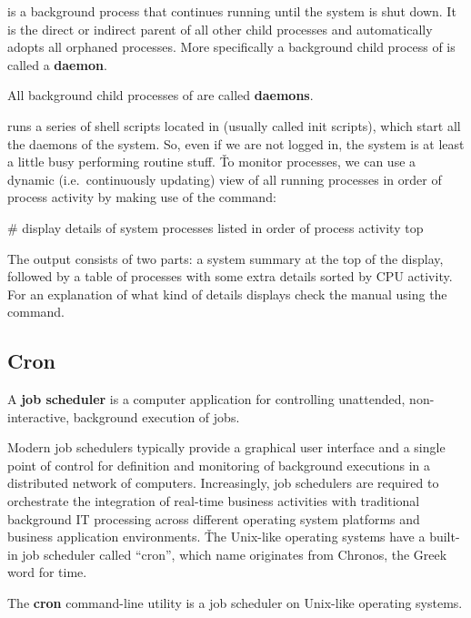  is a background process that continues running until the system is shut down. It is the direct or indirect
parent of all other child processes and automatically adopts all orphaned processes. More specifically a background
child process of  is called a \textbf{daemon}.

\bd[Daemon]
All background child processes of  are called \textbf{daemons}.
\ed

 runs a series of shell scripts located in  (usually called init scripts), which start all the
daemons of the system. So, even if we are not logged in, the system is at least a little busy performing routine stuff.
\v

To monitor processes, we can use a dynamic (i.e.\ continuously updating) view of all running processes in order of
process activity by making use of the  command:
\begin{bash}
# display details of system processes listed in order of process activity
top
\end{bash}

The  output consists of two parts: a system summary at the top of the display, followed by a table of
processes with some extra details sorted by CPU activity. For an explanation of what kind of details 
displays check the manual using the  command.

\subsection{Cron}\label{subsec:cron}

\label{def:job_scheduler}
A \textbf{job scheduler} is a computer application for controlling unattended, non-interactive, background execution of
jobs.
\ed

Modern job schedulers typically provide a graphical user interface and a single point of control for definition and
monitoring of background executions in a distributed network of computers. Increasingly, job schedulers are required
to orchestrate the integration of real-time business activities with traditional background IT processing across
different operating system platforms and business application environments. \v

The Unix-like operating systems have a built-in job scheduler called ``cron'', which name originates from Chronos, the
Greek word for time.

\bd[Cron]
The \textbf{cron} command-line utility is a job scheduler on Unix-like operating systems.
\ed


